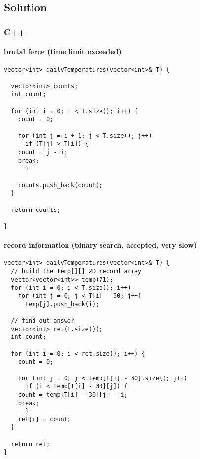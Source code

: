 \documentclass[11pt]{article}
\begin{document}
\subsection{Solution}
\label{sec:org7dd6e8a}
\subsubsection{C++}
\label{sec:orgfeafcfe}
\paragraph{brutal force (time limit exceeded)}
\label{sec:orgc91b472}
\begin{verbatim}
vector<int> dailyTemperatures(vector<int>& T) {

  vector<int> counts;
  int count;

  for (int i = 0; i < T.size(); i++) {
    count = 0;

    for (int j = i + 1; j < T.size(); j++) 
      if (T[j] > T[i]) {
	count = j - i;
	break;
      }

    counts.push_back(count);
  }

  return counts;

}

\end{verbatim}
\paragraph{record information (binary search, accepted, very slow)}
\label{sec:org1b0ec73}
\begin{verbatim}
vector<int> dailyTemperatures(vector<int>& T) {
  // build the temp[][] 2D record array 
  vector<vector<int>> temp(71);
  for (int i = 0; i < T.size(); i++)
    for (int j = 0; j < T[i] - 30; j++)
      temp[j].push_back(i);

  // find out answer
  vector<int> ret(T.size());
  int count;

  for (int i = 0; i < ret.size(); i++) {
    count = 0;

    for (int j = 0; j < temp[T[i] - 30].size(); j++)
      if (i < temp[T[i] - 30][j]) {
	count = temp[T[i] - 30][j] - i;
	break;
      }
    ret[i] = count;
  }

  return ret;
}

\end{verbatim}
\end{document}
